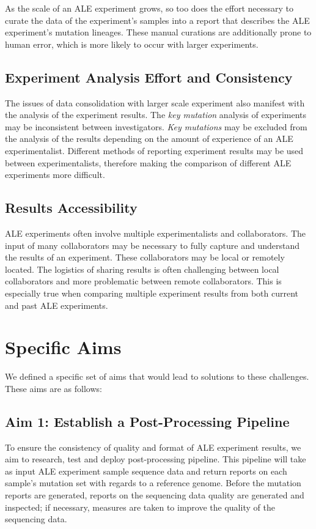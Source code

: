 \documentclass[12pt,final,masters,chapterheads]{ucsd}  %
\begin{document}
As the scale of an ALE experiment grows, so too does the effort necessary to curate the data of the experiment's samples into a report that describes the ALE experiment's mutation lineages. These manual curations are additionally prone to human error, which is more likely to occur with larger experiments.

\subsection{Experiment Analysis Effort and Consistency}

The issues of data consolidation with larger scale experiment also manifest with the analysis of the experiment results. The \textit{key mutation} analysis of experiments may be inconsistent between investigators. \textit{Key mutations} may be excluded from the analysis of the results depending on the amount of experience of an ALE experimentalist. Different methods of reporting experiment results may be used between experimentalists, therefore making the comparison of different ALE experiments more difficult.

\subsection{Results Accessibility}

%
%

ALE experiments often involve multiple experimentalists and collaborators. The input of many collaborators may be necessary to fully capture and understand the results of an experiment. These collaborators may be local or remotely located. The logistics of sharing results is often challenging between local collaborators and more problematic between remote collaborators. This is especially true when comparing multiple experiment results from both current and past ALE experiments.


\section{Specific Aims}

We defined a specific set of aims that would lead to solutions to these challenges. These aims are as follows:
\subsection{Aim 1: Establish a Post-Processing Pipeline}
To ensure the consistency of quality and format of ALE experiment results, we aim to research, test and deploy post-processing pipeline. This pipeline will take as input ALE experiment sample sequence data and return reports on each sample's mutation set with regards to a reference genome. Before the mutation reports are generated, reports on the sequencing data quality are generated and inspected; if necessary, measures are taken to improve the quality of the sequencing data.
\end{document}
